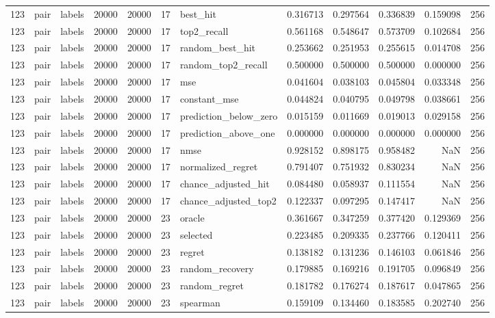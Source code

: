 \begin{tabular}{rllrrrlrrrrr}
123 & pair & labels & 20000 & 20000 & 17 & best_hit & 0.316713 & 0.297564 & 0.336839 & 0.159098 & 256 \\
123 & pair & labels & 20000 & 20000 & 17 & top2_recall & 0.561168 & 0.548647 & 0.573709 & 0.102684 & 256 \\
123 & pair & labels & 20000 & 20000 & 17 & random_best_hit & 0.253662 & 0.251953 & 0.255615 & 0.014708 & 256 \\
123 & pair & labels & 20000 & 20000 & 17 & random_top2_recall & 0.500000 & 0.500000 & 0.500000 & 0.000000 & 256 \\
123 & pair & labels & 20000 & 20000 & 17 & mse & 0.041604 & 0.038103 & 0.045804 & 0.033348 & 256 \\
123 & pair & labels & 20000 & 20000 & 17 & constant_mse & 0.044824 & 0.040795 & 0.049798 & 0.038661 & 256 \\
123 & pair & labels & 20000 & 20000 & 17 & prediction_below_zero & 0.015159 & 0.011669 & 0.019013 & 0.029158 & 256 \\
123 & pair & labels & 20000 & 20000 & 17 & prediction_above_one & 0.000000 & 0.000000 & 0.000000 & 0.000000 & 256 \\
123 & pair & labels & 20000 & 20000 & 17 & nmse & 0.928152 & 0.898175 & 0.958482 & NaN & 256 \\
123 & pair & labels & 20000 & 20000 & 17 & normalized_regret & 0.791407 & 0.751932 & 0.830234 & NaN & 256 \\
123 & pair & labels & 20000 & 20000 & 17 & chance_adjusted_hit & 0.084480 & 0.058937 & 0.111554 & NaN & 256 \\
123 & pair & labels & 20000 & 20000 & 17 & chance_adjusted_top2 & 0.122337 & 0.097295 & 0.147417 & NaN & 256 \\
123 & pair & labels & 20000 & 20000 & 23 & oracle & 0.361667 & 0.347259 & 0.377420 & 0.129369 & 256 \\
123 & pair & labels & 20000 & 20000 & 23 & selected & 0.223485 & 0.209335 & 0.237766 & 0.120411 & 256 \\
123 & pair & labels & 20000 & 20000 & 23 & regret & 0.138182 & 0.131236 & 0.146103 & 0.061846 & 256 \\
123 & pair & labels & 20000 & 20000 & 23 & random_recovery & 0.179885 & 0.169216 & 0.191705 & 0.096849 & 256 \\
123 & pair & labels & 20000 & 20000 & 23 & random_regret & 0.181782 & 0.176274 & 0.187617 & 0.047865 & 256 \\
123 & pair & labels & 20000 & 20000 & 23 & spearman & 0.159109 & 0.134460 & 0.183585 & 0.202740 & 256 \\

\end{tabular}
